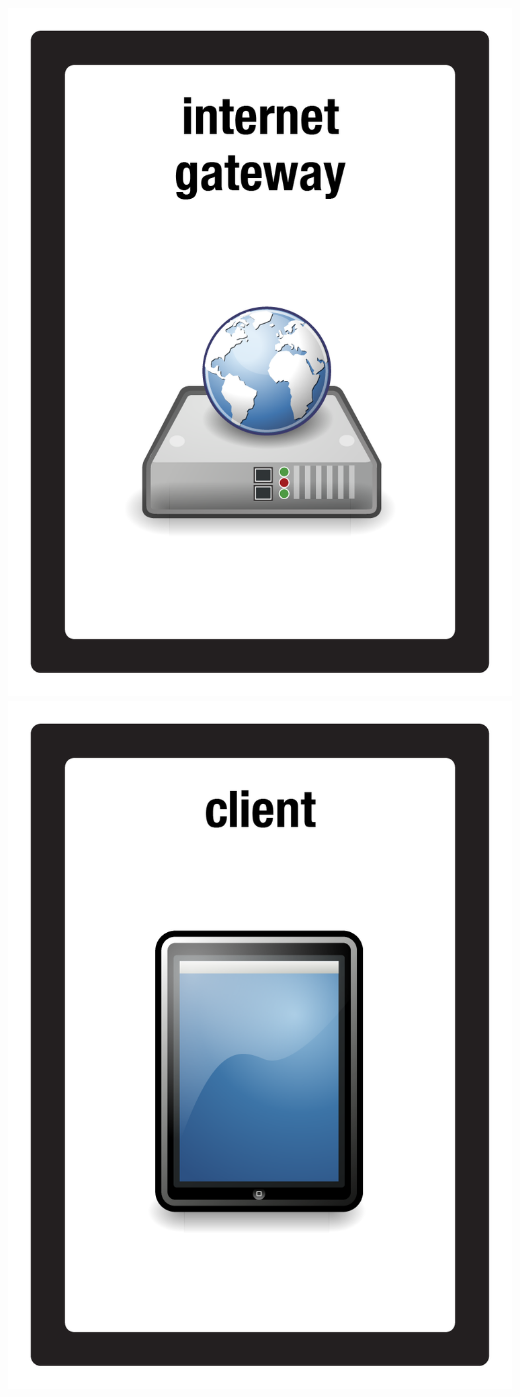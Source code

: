 \documentclass{letter}
\begin{document}
\includegraphics{patch/patch_internet_gateway}
\includegraphics{patch/patch_client_tablet}
\end{document}
